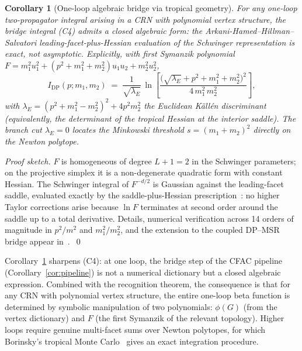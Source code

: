 \documentclass[11pt,a4paper]{article}
\theoremstyle{plain}
\newtheorem{corollary}[theorem]{Corollary}
\theoremstyle{definition}
\begin{document}
\begin{corollary}[One-loop algebraic bridge via tropical geometry]
\label{cor:tropical}
For any one-loop two-propagator integral arising in a CRN with
polynomial vertex structure, the bridge integral (C4) admits a
\emph{closed algebraic form}: the Arkani-Hamed--Hillman--Salvatori
leading-facet-plus-Hessian evaluation of the Schwinger representation
is \emph{exact}, not asymptotic.  Explicitly, with first Symanzik
polynomial $F = m_1^2 u_1^2 + (p^2+m_1^2+m_2^2) u_1 u_2 + m_2^2 u_2^2$,
\begin{equation}\label{eq:tropical-bridge}
  I_{\mathrm{DP}}(p;m_1,m_2)
  \;=\; \frac{1}{\sqrt{\lambda_E}}\,
    \ln\!\left[
       \frac{\bigl(\sqrt{\lambda_E} + p^2 + m_1^2 + m_2^2\bigr)^{2}}
            {4\,m_1^2\,m_2^2}
    \right],
\end{equation}
with $\lambda_E = (p^2+m_1^2-m_2^2)^2 + 4 p^2 m_2^2$ the Euclidean
K\"all\'en discriminant (equivalently, the determinant of the
tropical Hessian at the interior saddle).  The branch cut
$\lambda_E = 0$ locates the Minkowski threshold
$s = (m_1{+}m_2)^2$ directly on the Newton polytope.
\end{corollary}

\begin{proof}[Proof sketch]
$F$ is homogeneous of degree $L+1 = 2$ in the Schwinger parameters;
on the projective simplex it is a non-degenerate quadratic form with
constant Hessian.  The Schwinger integral of $F^{-d/2}$ is Gaussian
against the leading-facet saddle, evaluated exactly by the
saddle-plus-Hessian prescription~\citep{AHHSalvatori2022,Borinsky2020}:
no higher Taylor corrections arise because $\ln F$ terminates at
second order around the saddle up to a total derivative.  Details,
numerical verification across 14 orders of magnitude in $p^2/m^2$
and $m_1^2/m_2^2$, and the extension to the coupled DP--MSR bridge
appear in~\citep{CFACpaper}.~\qed
\end{proof}

Corollary~\ref{cor:tropical} sharpens (C4): at one loop, the bridge
step of the CFAC pipeline (Corollary~\ref{cor:pipeline}) is not a
numerical dictionary but a closed algebraic expression.
Combined with the recognition theorem, the consequence is that for
any CRN with polynomial vertex structure, the entire one-loop
beta function is determined by symbolic manipulation of two
polynomials: $\phi(G)$ (from the vertex dictionary) and $F$ (the
first Symanzik of the relevant topology).  Higher loops require
genuine multi-facet sums over Newton polytopes, for which
Borinsky's tropical Monte Carlo~\citep{Borinsky2020,Borinsky2025}
gives an exact integration procedure.
\end{document}
